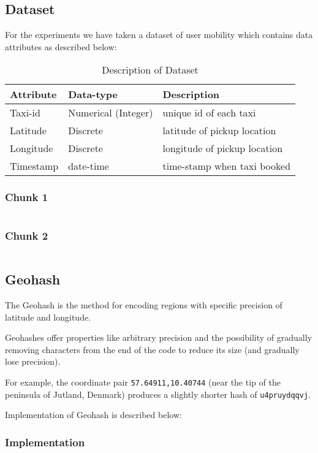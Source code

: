 \documentclass[paper=letter, fontsize=12pt]{article}
\begin{document}
\subsection{Dataset}\label{sample-data}
For the experiments we have taken a dataset of user mobility which contains data attributes as described below:
\begin{table}[H]
	\centering
	\renewcommand{\arraystretch}{1.5}
	\begin{tabular}{l | l | l}
		Attribute & Data-type & Description
		\\ \hline \hline
		Taxi-id & Numerical (Integer) & unique id of each taxi
		\\ \hline
		Latitude & Discrete & latitude of pickup location
		\\ \hline
		Longitude & Discrete & longitude of pickup location
		\\ \hline
		Timestamp & date-time & time-stamp when taxi booked
	\end{tabular}
	\caption{Description of Dataset}
\end{table}

\subsubsection{Chunk 1}\label{chunk-1}
\inputminted[firstline=0,lastline=10]{text}{../file1.txt}
\subsubsection{Chunk 2}\label{chunk-2}
\inputminted[firstline=2050,lastline=2060]{text}{../file1.txt}

\subsection{Geohash}\label{geohash}
The Geohash is the method for encoding regions with specific precision of latitude and longitude. 

Geohashes offer properties like arbitrary precision and the possibility of gradually removing characters from the end of the code to reduce its size (and gradually lose precision).

For example, the coordinate pair \verb|57.64911,10.40744| (near the tip of the peninsula of Jutland, Denmark) produces a slightly shorter hash of \verb|u4pruydqqvj|.

Implementation of Geohash is described below:
\subsubsection{Implementation}
\inputminted{python}{../geohash.py}
\end{document}
